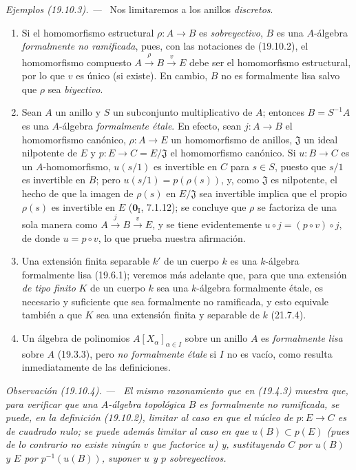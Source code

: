 \documentclass[10pt,oneside]{book}
\makeatletter
\newcommand{\setmanualcurrentlabel}[1]{\def\@currentlabel{#1}}
\newcommand{\oldpage}[2][]{%
  \setcounter{footnote}{0}%
  \marginpar{\scriptsize\textbf{#1}~|~#2}\ignorespaces}
\newenvironment{remark}[1][]{%
  \setmanualcurrentlabel{#1}\par\medskip\noindent\itshape Observación (#1). ---\ }{\par}
\newenvironment{examples}[1][]{%
  \setmanualcurrentlabel{#1}\par\medskip\noindent\textit{Ejemplos (#1). ---}\ }{\par}
\makeatother
\begin{document}
\oldpage[0\textsubscript{IV-1}]{116}

\begin{examples}[19.10.3]
\label{0.19.10.3-es}
Nos limitaremos a los anillos \emph{discretos}.
\begin{enumerate}
  \item[(i)] Si el homomorfismo estructural $\rho:A\to B$ es
  \emph{sobreyectivo}, $B$ es una $A$-álgebra \emph{formalmente no ramificada},
  pues, con las notaciones de (19.10.2), el homomorfismo compuesto
  $A\xrightarrow{\rho}B\xrightarrow{v}E$ debe ser el homomorfismo estructural, por
  lo que $v$ es único (si existe). En cambio, $B$ no es formalmente lisa salvo
  que $\rho$ sea \emph{biyectivo}.
  \item[(ii)] Sean $A$ un anillo y $S$ un subconjunto multiplicativo de $A$;
  entonces $B=S^{-1}A$ es una $A$-álgebra \emph{formalmente étale}. En efecto,
  sean $j:A\to B$ el homomorfismo canónico, $\rho:A\to E$ un homomorfismo de
  anillos, $\mathfrak J$ un ideal nilpotente de $E$ y
  $p:E\to C=E/\mathfrak J$ el homomorfismo canónico. Si $u:B\to C$ es un
  $A$-homomorfismo, $u(s/1)$ es invertible en $C$ para $s\in S$, puesto que
  $s/1$ es invertible en $B$; pero $u(s/1)=p(\rho(s))$, y, como $\mathfrak J$
  es nilpotente, el hecho de que la imagen de $\rho(s)$ en $E/\mathfrak J$ sea
  invertible implica que el propio $\rho(s)$ es invertible en $E$
  ($\mathbf 0_{\mathrm I}$, 7.1.12); se concluye que $\rho$ se factoriza de una
  sola manera como $A\xrightarrow{j}B\xrightarrow{v}E$, y se tiene
  evidentemente $u\circ j=(p\circ v)\circ j$, de donde $u=p\circ v$, lo que
  prueba nuestra afirmación.
  \item[(iii)] Una extensión finita separable $k'$ de un cuerpo $k$ es una
  $k$-álgebra formalmente lisa (19.6.1); veremos más adelante que, para que una
  extensión \emph{de tipo finito} $K$ de un cuerpo $k$ sea una $k$-álgebra
  formalmente étale, es necesario y suficiente que sea formalmente no
  ramificada, y esto equivale también a que $K$ sea una extensión finita y
  separable de $k$ (21.7.4).
  \item[(iv)] Un álgebra de polinomios $A[X_\alpha]_{\alpha\in I}$ sobre un
  anillo $A$ es \emph{formalmente lisa} sobre $A$ (19.3.3), pero \emph{no
  formalmente étale} si $I$ no es vacío, como resulta inmediatamente de las
  definiciones.
\end{enumerate}
\end{examples}

\begin{remark}[19.10.4]
\label{0.19.10.4-es}
El mismo razonamiento que en (19.4.3) muestra que, para verificar que una
$A$-álgebra topológica $B$ es formalmente no ramificada, se puede, en la
definición (19.10.2), limitar al caso en que el núcleo de $p:E\to C$ es
\emph{de cuadrado nulo}; se puede además limitar al caso en que $u(B)\subset p(E)$
(pues de lo contrario no existe ningún $v$ que factorice $u$) y, sustituyendo
$C$ por $u(B)$ y $E$ por $p^{-1}(u(B))$, suponer $u$ y $p$ \emph{sobreyectivos}.
\end{remark}
\end{document}
